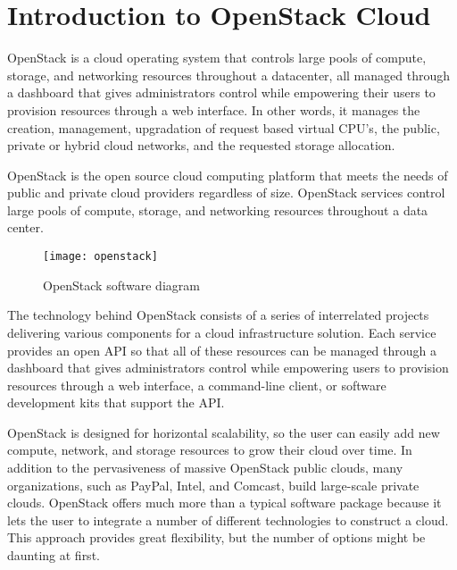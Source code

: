 
\chapter{Introduction to OpenStack Cloud}\label{ch:introduction_openstack}
\sffamily{}
OpenStack is a cloud operating system that controls large pools of compute, storage, and networking resources throughout a datacenter, all managed through a dashboard that gives administrators control while empowering their users to provision resources through a web interface. In other words, it manages the creation, management, upgradation of request based virtual CPU's, the public, private or hybrid cloud networks, and the requested storage allocation.

OpenStack is the open source cloud computing platform that meets the needs of public and private cloud providers regardless of size. OpenStack services control large pools of compute, storage, and networking resources throughout a data center.

\begin{figure}[H]
  \centering
  \texttt{[image: openstack]}
  \caption{OpenStack software diagram}\label{fig:openstack}
\end{figure}

The technology behind OpenStack consists of a series of interrelated projects delivering various components for a cloud infrastructure solution. Each service provides an open API so that all of these resources can be managed through a dashboard that gives administrators control while empowering users to provision resources through a web interface, a command-line client, or software development kits that support the API.

OpenStack is designed for horizontal scalability, so the user can easily add new compute, network, and storage resources to grow their cloud over time. In addition to the pervasiveness of massive OpenStack public clouds, many organizations, such as PayPal, Intel, and Comcast, build large-scale private clouds. OpenStack offers much more than a typical software package because it lets the user to integrate a number of different technologies to construct a cloud. This approach provides great flexibility, but the number of options might be daunting at first.

